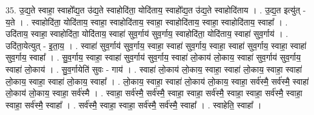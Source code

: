 \documentclass[17pt]{extarticle}
\begin{document}
35. उ॒द्य॒ते स्वाहा॒ स्वाहो᳚द्य॒त उ॑द्य॒ते स्वाहोदि॑ता॒ योदि॑ताय॒ स्वाहो᳚द्य॒त उ॑द्य॒ते स्वाहोदि॑ताय । . उ॒द्य॒त इत्यु॑त् - य॒ते । . स्वाहोदि॑ता॒ योदि॑ताय॒ स्वाहा॒ स्वाहोदि॑ताय॒ स्वाहा॒ स्वाहोदि॑ताय॒ स्वाहा॒ स्वाहोदि॑ताय॒ स्वाहा᳚ । . उदि॑ताय॒ स्वाहा॒ स्वाहोदि॑ता॒ योदि॑ताय॒ स्वाहा॑ सुव॒र्गाय॑ सुव॒र्गाय॒ स्वाहोदि॑ता॒ योदि॑ताय॒ स्वाहा॑ सुव॒र्गाय॑ । . उदि॑ता॒येत्युत् - इ॒ता॒य॒ । . स्वाहा॑ सुव॒र्गाय॑ सुव॒र्गाय॒ स्वाहा॒ स्वाहा॑ सुव॒र्गाय॒ स्वाहा॒ स्वाहा॑ सुव॒र्गाय॒ स्वाहा॒ स्वाहा॑ सुव॒र्गाय॒ स्वाहा᳚ । . सु॒व॒र्गाय॒ स्वाहा॒ स्वाहा॑ सुव॒र्गाय॑ सुव॒र्गाय॒ स्वाहा॑ लो॒काय॑ लो॒काय॒ स्वाहा॑ सुव॒र्गाय॑ सुव॒र्गाय॒ स्वाहा॑ लो॒काय॑ । . सु॒व॒र्गायेति॑ सुवः - गाय॑ । . स्वाहा॑ लो॒काय॑ लो॒काय॒ स्वाहा॒ स्वाहा॑ लो॒काय॒ स्वाहा॒ स्वाहा॑ लो॒काय॒ स्वाहा॒ स्वाहा॑ लो॒काय॒ स्वाहा᳚ । . लो॒काय॒ स्वाहा॒ स्वाहा॑ लो॒काय॑ लो॒काय॒ स्वाहा॒ सर्व॑स्मै॒ सर्व॑स्मै॒ स्वाहा॑ लो॒काय॑ लो॒काय॒ स्वाहा॒ सर्व॑स्मै । . स्वाहा॒ सर्व॑स्मै॒ सर्व॑स्मै॒ स्वाहा॒ स्वाहा॒ सर्व॑स्मै॒ स्वाहा॒ स्वाहा॒ सर्व॑स्मै॒ स्वाहा॒ स्वाहा॒ सर्व॑स्मै॒ स्वाहा᳚ । . सर्व॑स्मै॒ स्वाहा॒ स्वाहा॒ सर्व॑स्मै॒ सर्व॑स्मै॒ स्वाहा᳚ । . स्वाहेति॒ स्वाहा᳚ । \newline
\pagebreak
\end{document}
